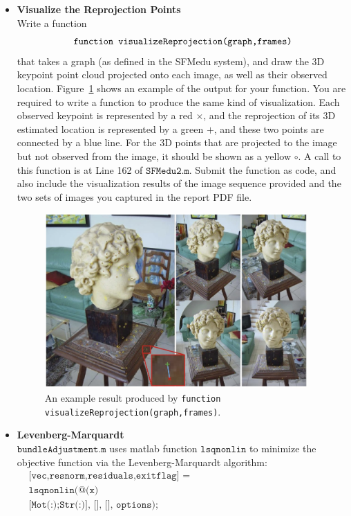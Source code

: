 \documentclass[11pt]{article}
\begin{document}
\begin{itemize}
\item{{\bf{Visualize the Reprojection Points}}\\
Write a function \vspace{-0.05in}
$$\texttt{function visualizeReprojection(graph,frames)}\vspace{-0.05in}$$
that takes a graph (as defined in the SFMedu system), and draw the 3D keypoint point cloud projected onto each image, as well
as their observed location. Figure~\ref{fig:visual} shows an example of the output for your function. You are required to write a function to produce the same kind of visualization. Each observed keypoint is represented by a red $\times$, and the reprojection of its 3D estimated location is represented by a green $+$, and these two points are connected by a blue line. For the 3D points that are projected to the image but not observed from the image, it should be shown as a yellow $\circ$. A call to this function is at Line 162 of $\texttt{SFMedu2.m}$. Submit the function as code, and also include the visualization results of the image sequence provided and the two sets of images you captured in the report PDF file.}

\begin{figure}[h!]
\centering
\includegraphics[width=0.95\textwidth]{tmpimages/visual.jpg}
\caption{An example result produced by \texttt{function visualizeReprojection(graph,frames)}.}
\label{fig:visual}
\end{figure}

\item{{\bf{Levenberg-Marquardt}}\\
$\texttt{bundleAdjustment.m}$ uses matlab function $\texttt{lsqnonlin}$ to minimize the objective function via the Levenberg-Marquardt algorithm: \vspace{-0.05in}
\begin{align*}
&\texttt{[vec,resnorm,residuals,exitflag] =}\\
&\texttt{lsqnonlin(@(x) reprojectionResidual(graph.ObsIdx,graph.ObsVal,px,py,f,x),}\\
&\texttt{[Mot(:);Str(:)], [], [], options);}
\end{align*}

}
\end{itemize}
\end{document}

